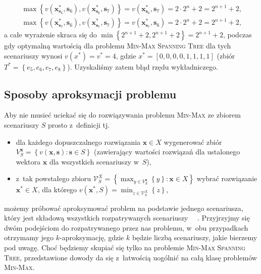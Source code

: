\begin{eqnarray}
	\max \left\{ v \left( \textbf{x}^{\ast}_{\textbf{s}_{6}}, \textbf{s}_{6} \right), v \left( \textbf{x}^{\ast}_{\textbf{s}_{6}}, \textbf{s}_{7} \right) \right\} = v \left( \textbf{x}^{\ast}_{\textbf{s}_{6}}, \textbf{s}_{7} \right) = 2 \cdot 2^{n} + 2 = 2^{n+1} + 2\text{,} \\
	\max \left\{ v \left( \textbf{x}^{\ast}_{\textbf{s}_{7}}, \textbf{s}_{6} \right), v \left( \textbf{x}^{\ast}_{\textbf{s}_{7}}, \textbf{s}_{7} \right) \right\} = v \left( \textbf{x}^{\ast}_{\textbf{s}_{7}}, \textbf{s}_{6} \right) = 2 \cdot 2^{n} + 2 = 2^{n+1} + 2\text{,}
\end{eqnarray}
a całe wyrażenie skraca się do $\min \left\{ 2^{n+1} + 2, 2^{n+1} + 2  \right\} = 2^{n+1} + 2$, podczas gdy optymalną wartością dla problemu \textsc{Min-Max Spanning Tree} dla tych scenariuszy wynosi $v \left( x^{\ast} \right) = v^{\ast} = 4$, gdzie $x^{\ast} = \left[ 0, 0, 0, 0, 1, 1, 1, 1 \right]$ (zbiór $T^{\ast} = \left\{ e_{5}, e_{6}, e_{7}, e_{8} \right\}$).
Uzyskaliśmy zatem błąd rzędu wykładniczego.



\subsection{Sposoby aproksymacji problemu}



Aby nie musieć uciekać się do rozwiązywania problemu \textsc{Min-Max} ze zbiorem scenariuszy $S$ prosto z~definicji tj.

\begin{itemize}
	\item dla każdego dopuszczalnego rozwiązania $\textbf{x} \in X$ wygenerować zbiór $V^{\textbf{x}}_{S} = \left\{ v \left( \textbf{x}, \textbf{s} \right) : \textbf{s} \in S \right\}$ (zawierający wartości rozwiązań dla ustalonego wektora $\textbf{x}$ dla wszystkich scenariuszy w~$S$),
	\item z~tak powstałego zbioru $\mathcal{V}^{X}_{S} = \left\{ \max_{y \in V^{\textbf{x}}_{S}} \left\{ y \right\} : \textbf{x} \in X  \right\}$ wybrać rozwiązanie $\textbf{x}^{\ast} \in X$, dla którego $v \left( \textbf{x}^{\ast}, S \right) = \min_{z \in \mathcal{V}^{X}_{S}} \left\{ z \right\}$,
\end{itemize}
możemy próbować aproksymować problem na podstawie jednego scenariusza, który jest składową wszystkich rozpatrywanych scenariuszy ~\cite{minmaxApprox}~\cite[$430$]{minmaxSurvey}.
Przyjrzyjmy się dwóm podejściom do rozpatrywanego przez nas problemu, w~obu przypadkach otrzymamy jego $k$-aproksymację, gdzie $k$ będzie liczbą scenariuszy, jakie bierzemy pod uwagę.
Choć będziemy skupiać się tylko na problemie \textsc{Min-Max Spanning Tree}, przedstawione dowody da się z~łatwością uogólnić na całą klasę problemów \textsc{Min-Max}.


